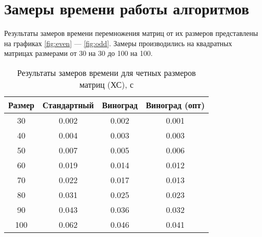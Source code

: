 \documentclass{bmstu}
\begin{document}
\section{Замеры времени работы алгоритмов}
Результаты замеров времени перемножения матриц от их размеров представлены на графиках \ref{fig:even} --- \ref{fig:odd}.
Замеры производились на квадратных матрицах размерами от 30 на 30 до 100 на 100.
\begin{table}[h]
    \begin{center}
        \begin{threeparttable}
        \captionsetup{justification=raggedright,singlelinecheck=off}
        \caption{Результаты замеров времени для четных размеров матриц (ХС), с}
        \label{tbl:time_mes_even}
        \begin{tabular}{|c|c|c|c|}
            \hline
            Размер & Стандартный & Виноград & Виноград (опт) \\
            \hline
            30    & 0.002 & 0.002 & 0.001 \\
            \hline
            40    & 0.004& 0.003 & 0.003\\
            \hline
            50    & 0.007& 0.005 & 0.006\\
            \hline
            60    & 0.019&0.014 &0.012\\
            \hline
            70    & 0.022& 0.017& 0.013 \\
            \hline
            80    & 0.031& 0.025& 0.023\\
            \hline
            90    & 0.043& 0.036 & 0.032 \\
            \hline
            100    & 0.062& 0.046 & 0.041\\
            \hline
		\end{tabular}
    \end{threeparttable}
\end{center}
\end{table}
\end{document}
